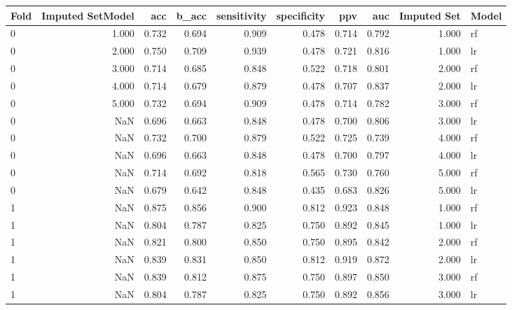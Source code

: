 \begin{tabular}{lrrrrrrrrl}
\toprule
Fold &  Imputed SetModel &   acc &  b\_acc &  sensitivity &  specificity &   ppv &   auc &  Imputed Set & Model \\
\midrule
   0 &             1.000 & 0.732 &  0.694 &        0.909 &        0.478 & 0.714 & 0.792 &        1.000 &    rf \\
   0 &             2.000 & 0.750 &  0.709 &        0.939 &        0.478 & 0.721 & 0.816 &        1.000 &    lr \\
   0 &             3.000 & 0.714 &  0.685 &        0.848 &        0.522 & 0.718 & 0.801 &        2.000 &    rf \\
   0 &             4.000 & 0.714 &  0.679 &        0.879 &        0.478 & 0.707 & 0.837 &        2.000 &    lr \\
   0 &             5.000 & 0.732 &  0.694 &        0.909 &        0.478 & 0.714 & 0.782 &        3.000 &    rf \\
   0 &               NaN & 0.696 &  0.663 &        0.848 &        0.478 & 0.700 & 0.806 &        3.000 &    lr \\
   0 &               NaN & 0.732 &  0.700 &        0.879 &        0.522 & 0.725 & 0.739 &        4.000 &    rf \\
   0 &               NaN & 0.696 &  0.663 &        0.848 &        0.478 & 0.700 & 0.797 &        4.000 &    lr \\
   0 &               NaN & 0.714 &  0.692 &        0.818 &        0.565 & 0.730 & 0.760 &        5.000 &    rf \\
   0 &               NaN & 0.679 &  0.642 &        0.848 &        0.435 & 0.683 & 0.826 &        5.000 &    lr \\
   1 &               NaN & 0.875 &  0.856 &        0.900 &        0.812 & 0.923 & 0.848 &        1.000 &    rf \\
   1 &               NaN & 0.804 &  0.787 &        0.825 &        0.750 & 0.892 & 0.845 &        1.000 &    lr \\
   1 &               NaN & 0.821 &  0.800 &        0.850 &        0.750 & 0.895 & 0.842 &        2.000 &    rf \\
   1 &               NaN & 0.839 &  0.831 &        0.850 &        0.812 & 0.919 & 0.872 &        2.000 &    lr \\
   1 &               NaN & 0.839 &  0.812 &        0.875 &        0.750 & 0.897 & 0.850 &        3.000 &    rf \\
   1 &               NaN & 0.804 &  0.787 &        0.825 &        0.750 & 0.892 & 0.856 &        3.000 &    lr \\

\end{tabular}
